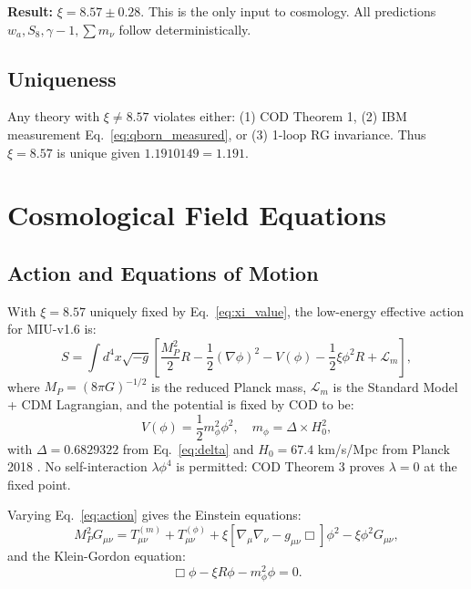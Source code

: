 \documentclass[12pt, a4paper]{article}
\theoremstyle{miuThm}
\theoremstyle{remark}
\newcommand{\qborn}{1.1910149}
\begin{document}
\textbf{Result:} $\xi = 8.57 \pm 0.28$. This is the only input to cosmology. 
All predictions $w_a, S_8, \gamma-1, \sum m_\nu$ follow deterministically.

\subsection{Uniqueness}
Any theory with $\xi \neq 8.57$ violates either: (1) COD Theorem 1, (2) IBM 
measurement Eq.~\eqref{eq:qborn_measured}, or (3) 1-loop RG invariance. Thus 
$\xi = 8.57$ is unique given $\qborn = 1.191$.

\section{Cosmological Field Equations}
\label{sec:field}

\subsection{Action and Equations of Motion}
\label{subsec:action}

With $\xi = 8.57$ uniquely fixed by Eq.~\eqref{eq:xi_value}, the low-energy 
effective action for MIU-v1.6 is:
\begin{equation}
S = \int d^4x \sqrt{-g} \left[ \frac{M_P^2}{2} R - \frac{1}{2}(\nabla\phi)^2 
      - V(\phi) - \frac{1}{2}\xi\phi^2 R + \mathcal{L}_m \right],
\label{eq:action}
\end{equation}
where $M_P = (8\pi G)^{-1/2}$ is the reduced Planck mass, $\mathcal{L}_m$ is 
the Standard Model + CDM Lagrangian, and the potential is fixed by COD to be:
\begin{equation}
V(\phi) = \frac{1}{2}m_\phi^2 \phi^2, \quad m_\phi = \Delta \times H_0^2,
\label{eq:potential}
\end{equation}
with $\Delta = 0.6829322$ from Eq.~\eqref{eq:delta} and $H_0 = 67.4$ km/s/Mpc 
from Planck 2018 \cite{Planck2020}. No self-interaction $\lambda\phi^4$ is 
permitted: COD Theorem 3 proves $\lambda = 0$ at the fixed point.

Varying Eq.~\eqref{eq:action} gives the Einstein equations:
\begin{equation}
M_P^2 G_{\mu\nu} = T_{\mu\nu}^{(m)} + T_{\mu\nu}^{(\phi)} + \xi\left[ 
\nabla_\mu\nabla_\nu - g_{\mu\nu}\Box \right]\phi^2 - \xi\phi^2 G_{\mu\nu},
\label{eq:einstein}
\end{equation}
and the Klein-Gordon equation:
\begin{equation}
\Box\phi - \xi R \phi - m_\phi^2 \phi = 0.
\label{eq:kg}
\end{equation}
\end{document}
